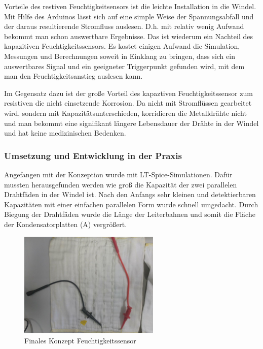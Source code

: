 Vorteile des restiven Feuchtigkeitsensors  ist die leichte Installation in die Windel. Mit Hilfe des Arduinos lässt sich auf eine simple Weise der Spannungsabfall und der daraus resultierende Stromfluss auslesen. D.h. mit relativ wenig Aufwand bekommt man schon auswertbare Ergebnisse. Das ist wiederum ein Nachteil des kapazitiven Feuchtigkeitssensors. Es kostet einigen Aufwand die Simulation, Messungen und Berechnungen soweit in Einklang zu bringen, dass sich ein auswertbares Signal und ein geeigneter Triggerpunkt gefunden wird, mit dem man den Feuchtigkeitsanstieg auslesen kann.

Im Gegensatz dazu ist der große Vorteil des kapaztiven Feuchtigkeitssensor zum resistiven die nicht einsetzende Korrosion. Da nicht mit Stromflüssen gearbeitet wird, sondern mit Kapazitätsunterschieden, korridieren die Metalldrähte nicht und man bekommt eine signifikant längere Lebensdauer der Drähte in der Windel und hat keine medizinischen Bedenken.
\pagebreak

\subsubsection{Umsetzung und Entwicklung in der Praxis}
Angefangen mit der Konzeption wurde mit LT-Spice-Simulationen. Dafür mussten herausgefunden werden wie groß die Kapazität der zwei parallelen Drahtfäden in der Windel ist. Nach den Anfangs sehr kleinen und detektierbaren Kapazitäten mit einer einfachen parallelen Form wurde schnell umgedacht. Durch Biegung der Drahtfäden wurde die Länge der Leiterbahnen und somit die Fläche der Kondensatorplatten (A) vergrößert.

\begin{figure}[ht]
	\centering
		\includegraphics[width=0.6\textwidth]{includes/kom/graphics/windel_cap_sensor_final}
	\caption{Finales Konzept Feuchtigkeitssensor}
	\label{fig:cap_sensor_final}
\end{figure}

